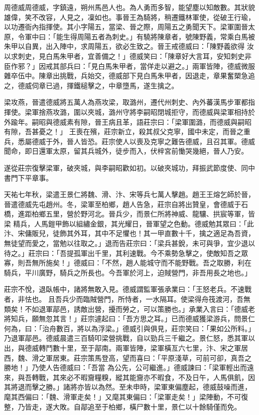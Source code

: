 
\begin{pinyinscope}

 周德威周德威，字鎮遠，朔州馬邑人也。為人勇而多智，能望塵以知敵數。其狀貌雄偉，笑不改容，人見之，凜如也。事晉王為騎將，稍遷鐵林軍使，從破王行瑜，以功遷衙內指揮使。其小字陽五，當梁、晉之際，周陽五之勇聞天下。梁軍圍晉太原，令軍中曰：「能生得周陽五者為刺史。」有驍將陳章者，號陳野義，常乘白馬被朱甲以自異，出入陣中，求周陽五，欲必生致之。晉王戒德威曰：「陳野義欲得
 汝以求刺史，見白馬朱甲者，宜善備之！」德威笑曰：「陳章好大言耳，安知刺史非臣作邪？」因戒其部兵曰：「見白馬朱甲者，當佯走以避之。」兩軍皆陣，德威微服雜卒伍中。陳章出挑戰，兵始交，德威部下見白馬朱甲者，因退走，章果奮槊急追之，德威伺章已過，揮鐵槌擊之，中章墮馬，遂生擒之。



 梁攻燕，晉遣德威將五萬人為燕攻梁，取潞州，遷代州刺史、內外蕃漢馬步軍都指揮使。梁軍捨燕攻潞，圍以夾城，潞州守將李嗣昭閉城拒守，而德威與梁軍相持於外踰年。嗣昭與德威素有隙，晉王病且革，語莊宗曰：「梁軍圍潞，而德威與嗣昭有隙，吾甚憂之！」
 王喪在殯，莊宗新立，殺其叔父克寧，國中未定，而晉之重兵，悉屬德威于外，晉人皆恐。莊宗使人以喪及克寧之難告德威，且召其軍。德威聞命，即日還軍太原，留其兵城外，徒步而入，伏梓宮前慟哭幾絕，晉人乃安。



 遂從莊宗復擊梁軍，破夾城，與李嗣昭歡如初。以破夾城功，拜振武節度使、同中書門下平章事。



 天祐七年秋，梁遣王景仁將魏、滑、汴、宋等兵七萬人擊趙。趙王王熔乞師於晉，晉遣德威先屯趙州。冬，梁軍至柏鄉，趙人告急，莊宗自將出贊皇，會德威于石橋，進距柏鄉五里，營於野河北。晉兵少，而景仁所將神威、龍驤、拱宸等軍，皆梁
 精兵，人馬鎧甲飾以組繡金銀，其光耀日，晉軍望之色動。德威勉其眾曰：「此汴、宋傭販兒，徒飾其外耳，其中不足懼也！其一甲直數十千，擒之適足為吾資，無徒望而愛之，當勉以往取之。」退而告莊宗曰：「梁兵甚銳，未可與爭，宜少退以待之。」莊宗曰：「吾提孤軍出千里，其利速戰。今不乘勢急擊之，使敵知吾之眾寡，則吾無所施矣！」德威曰：「不然，趙人能城守而不能野戰。吾之取勝，利在騎兵，平川廣野，騎兵之所長也。今吾軍於河上，迫賊營門，非吾用長之地也。」



 莊宗不悅，退臥帳中，諸將無敢入見。德威謂監軍張承業曰：「王怒老兵。不速戰者，非怯也。
 且吾兵少而臨賊營門，所恃者，一水隔耳。使梁得舟筏渡河，吾無類矣！不如退軍鄗邑，誘敵出營，擾而勞之，可以策勝也。」承業入言曰：「德威老將知兵，願無忽其言！」莊宗遽起曰：「吾方思之耳。」已而德威獲梁游兵，問景仁何為，曰：「治舟數百，將以為浮梁。」德威引與俱見，莊宗笑曰：「果如公所料。」乃退軍鄗邑。德威晨遣三百騎叩梁營挑戰，自以勁兵三千繼之。景仁怒，悉其軍以出，與德威轉鬥數十里，至于鄗南。兩軍皆陣，梁軍橫亙六七里，汴、宋之軍居西，魏、滑之軍居東。莊宗策馬登高，望而喜曰：「平原淺草，可前可卻，真吾之勝地！」乃使人告德威曰：「吾當
 為公先，公可繼進。」德威諫曰：「梁軍輕出而遠來，與吾轉戰，其來必不暇齎糧糗，縱其能齎亦不暇食，不及日午，人馬俱飢，因其將退而擊之勝。」諸將亦皆以為然。至未申時，梁軍東偏塵起，德威鼓噪而進，麾其西偏曰：「魏、滑軍走矣！」又麾其東偏曰：「梁軍走矣！」梁陣動，不可復整，乃皆走，遂大敗。自鄗追至于柏鄉，橫尸數十里，景仁以十餘騎僅而免。




\end{pinyinscope}
